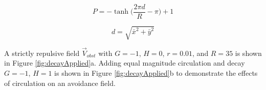 \documentclass[conf]{new-aiaa}
\begin{document}
\begin{equation}
\label{eq:decay}
P = -\tanh \bigg( \frac{2\pi d}{R}-\pi\bigg)+1
\end{equation}

\begin{equation}
\label{eq:range}
d = \sqrt{ \bar{x}^2+\bar{y}^2}
\end{equation}

A strictly repulsive field $\overrightarrow{V}_{obst}$ with $G=-1$, $H=0$, $r=0.01$, and $R = 35$ is shown in Figure \ref{fig:decayApplied}a. Adding equal magnitude circulation and decay $G=-1$, $H=1$ is shown in Figure \ref{fig:decayApplied}b to demonstrate the effects of circulation on an avoidance field.


%
%
%
%
%
%
%
%
%
%

\end{document}
